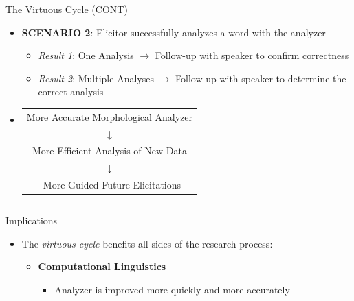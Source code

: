 \documentclass[usenames,dvipsnames]{beamer}
\begin{document}
\begin{frame}[fragile]
\begin{columns}
\begin{column}{0.3\textwidth}
\begin{block}{The Virtuous Cycle ({\small CONT})}
\begin{itemize}
\setlength\itemsep{48pt}
    \item \textbf{SCENARIO 2}: Elicitor successfully analyzes a word with the analyzer
    \vspace{24pt}
    \begin{itemize}
    \setlength\itemsep{24pt}
    \item \textit{Result 1}: One Analysis $\rightarrow$ Follow-up with speaker to confirm correctness
            
    \item \textit{Result 2}: Multiple Analyses $\rightarrow$ Follow-up with speaker to determine the correct analysis
    \end{itemize}
    
    \item
    \begin{tabular}[t]{c}
    More Accurate Morphological Analyzer \\
    $\downarrow$ \\
    More Efficient Analysis of New Data \\
    $\downarrow$ \\\
    More Guided Future Elicitations
    \end{tabular}
\end{itemize}

\end{block}
\end{column}

\end{columns}

\vspace{18pt}

\begin{columns}[T]

\begin{column}{0.46\textwidth}
\begin{block}{Implications}

\begin{itemize}
    \item The \textit{virtuous cycle} benefits all sides of the research process:
        \vspace{18pt}
        \begin{itemize}
        \setlength\itemsep{18pt}
        
            \item \textbf{Computational Linguistics}
            \vspace{12pt}
            \begin{itemize}
            \setlength\itemsep{12pt}
                \item Analyzer is improved more quickly and more accurately
            

\end{itemize}
\end{itemize}
\end{itemize}
\end{block}
\end{column}
\end{columns}
\end{frame}
\end{document}
